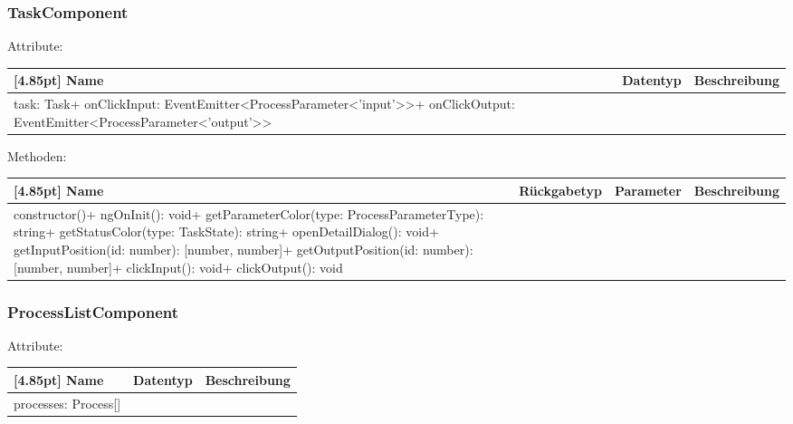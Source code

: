         	\subsubsection{TaskComponent}
        	
        	    Attribute:
                \begin{center}
                	\renewcommand{\arraystretch}{1.5}
                    \setlength\tabcolsep{5pt}
                	\begin{tabularx}{\textwidth}{|l|l|X|}
                		\hline
                        \rowcolor[gray]{0.75}[4.85pt]            		
                        Name & Datentyp & Beschreibung \\ \hline
                        task: Task+ onClickInput: EventEmitter<ProcessParameter<'input'>>+ onClickOutput: EventEmitter<ProcessParameter<'output'>>
                        & &  \\ \hline
                	\end{tabularx}
                \end{center}
                
                Methoden:
        		\begin{center}
                \setlength\tabcolsep{5pt}
                	\renewcommand{\arraystretch}{1.5}
                    	\begin{tabularx}{\textwidth}{|l|l|l|X|}
                    	\hline
                    	\rowcolor[gray]{0.75}[4.85pt]
                		Name & Rückgabetyp & Parameter & Beschreibung \\ \hline
                		constructor()+ ngOnInit(): void+ getParameterColor(type: ProcessParameterType): string+ getStatusColor(type: TaskState): string+ openDetailDialog(): void+ getInputPosition(id: number): [number, number]+ getOutputPosition(id: number): [number, number]+ clickInput(): void+ clickOutput(): void
                        & & &  \\ \hline
                        \end{tabularx}
        		\end{center}
        	
        	\subsubsection{ProcessListComponent}
        	
        	    Attribute:
                \begin{center}
                	\renewcommand{\arraystretch}{1.5}
                    \setlength\tabcolsep{5pt}
                	\begin{tabularx}{\textwidth}{|l|l|X|}
                		\hline
                        \rowcolor[gray]{0.75}[4.85pt]            		
                        Name & Datentyp & Beschreibung \\ \hline
                        processes: Process[]
                        & &  \\ \hline
                	\end{tabularx}
                \end{center}
                
